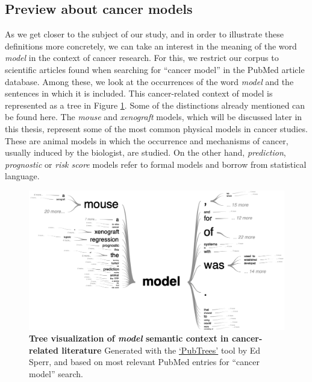 \documentclass[a4paper,12pt,twoside,onecolumn,openright,final,oldfontcommands]{memoir}
\begin{document}
\subsection{Preview about cancer
models}\label{preview-about-cancer-models}

As we get closer to the subject of our study, and in order to illustrate
these definitions more concretely, we can take an interest in the
meaning of the word \emph{model} in the context of cancer research. For
this, we restrict our corpus to scientific articles found when searching
for ``cancer model'' in the PubMed article database. Among these, we
look at the occurrences of the word \emph{model} and the sentences in
which it is included. This cancer-related context of model is
represented as a tree in Figure \ref{fig:pubmed-tree}. Some of the
distinctions already mentioned can be found here. The \emph{mouse} and
\emph{xenograft} models, which will be discussed later in this thesis,
represent some of the most common physical models in cancer studies.
These are animal models in which the occurrence and mechanisms of
cancer, usually induced by the biologist, are studied. On the other
hand, \emph{prediction}, \emph{prognostic} or \emph{risk score} models
refer to formal models and borrow from statistical language.

\begin{figure}

{\centering \includegraphics[width=0.9\linewidth]{fig/pubmed-tree} 

}

\caption[Tree visualization of \emph{model} semantic context in cancer-related literature]{\textbf{Tree visualization of \emph{model}
semantic context in cancer-related literature} Generated with the
\href{https://esperr.github.io/pub-trees/}{`PubTrees'} tool by Ed Sperr,
and based on most relevant PubMed entries for ``cancer model'' search.}\label{fig:pubmed-tree}
\end{figure}
\end{document}
